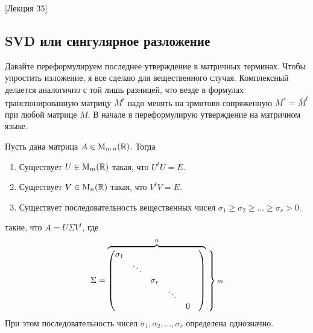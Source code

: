 [Лекция 35]


\subsection{SVD или сингулярное разложение}

Давайте переформулируем последнее утверждение в матричных терминах.
Чтобы упростить изложение, я все сделаю для вещественного случая.
Комплексный делается аналогично с той лишь разницей, что везде в формулах транспонированную матрицу $M^t$ надо менять на эрмитово сопряженную $M^* = \bar M^t$ при любой матрице $M$.
В начале я переформулирую утверждение на матричном языке.

\begin{claim}
Пусть дана матрица $A\in \operatorname{M}_{m\,n}(\mathbb R)$.
Тогда
\begin{enumerate}
\item Существует $U\in \operatorname{M}_{m}(\mathbb R)$ такая, что $U^t U = E$.

\item Существует $V\in \operatorname{M}_{n}(\mathbb R)$ такая, что $V^t V = E$.

\item Существует последовательность вещественных чисел $\sigma_1\geqslant \sigma_2\geqslant \ldots\geqslant \sigma_r > 0$.
\end{enumerate}
такие, что $A = U \Sigma V^t$, где
\[
\Sigma =
\overbrace{
\begin{pmatrix}
{\sigma_1}&{}&{}&{}&{}&{}\\
{}&{\ddots}&{}&{}&{}&{}\\
{}&{}&{\sigma_r}&{}&{}&{}\\
{}&{}&{}&{\ddots}&{}&{}\\
{}&{}&{}&{}&{0}&{}\\
\end{pmatrix}
}^n
\left.
\vphantom{
\begin{pmatrix}
{\sigma_1}&{}&{}&{}&{}&{}\\
{}&{\ddots}&{}&{}&{}&{}\\
{}&{}&{\sigma_r}&{}&{}&{}\\
{}&{}&{}&{\ddots}&{}&{}\\
{}&{}&{}&{}&{0}&{}\\
\end{pmatrix}
}
\right\}{\scriptstyle m}
\]
При этом последовательность чисел $\sigma_1,\sigma_2,\ldots,\sigma_r$ определена однозначно.
\end{claim}


